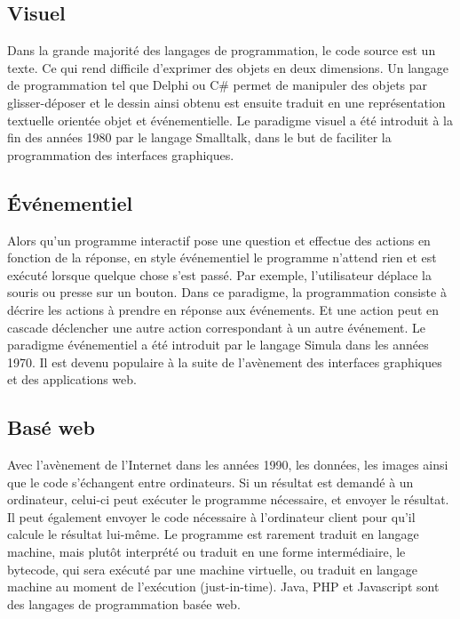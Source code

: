 \documentclass[a4paper,12pt]{article}
\begin{document}
\subsection{Visuel}

Dans la grande majorité des langages de programmation, le code source est un texte. Ce qui rend difficile d'exprimer des objets en deux dimensions\cite{kumar}. Un langage de programmation tel que Delphi ou C\# permet de manipuler des objets par glisser-déposer et le dessin ainsi obtenu est ensuite traduit en une représentation textuelle orientée objet et événementielle. Le paradigme visuel a été introduit à la fin des années 1980 par le langage Smalltalk, dans le but de faciliter la programmation des interfaces graphiques\cite{kumar}.

\subsection{Événementiel}

Alors qu'un programme interactif pose une question et effectue des actions en fonction de la réponse, en style événementiel le programme n'attend rien et est exécuté lorsque quelque chose s'est passé\cite{kumar}. Par exemple, l'utilisateur déplace la souris ou presse sur un bouton. Dans ce paradigme, la programmation consiste à décrire les actions à prendre en réponse aux événements. Et une action peut en cascade déclencher une autre action correspondant à un autre événement\cite{kumar}. Le paradigme événementiel a été introduit par le langage Simula dans les années 1970. Il est devenu populaire à la suite de l'avènement des interfaces graphiques et des applications web\cite{kumar}.

\subsection{Basé web}

Avec l’avènement de l'Internet dans les années 1990, les données, les images ainsi que le code s'échangent entre ordinateurs. Si un résultat est demandé à un ordinateur, celui-ci peut exécuter le programme nécessaire, et envoyer le résultat. Il peut également envoyer le code nécessaire à l'ordinateur client pour qu'il calcule le résultat lui-même\cite{kumar}. Le programme est rarement traduit en langage machine, mais plutôt interprété ou traduit en une forme intermédiaire, le bytecode, qui sera exécuté par une machine virtuelle, ou traduit en langage machine au moment de l'exécution (just-in-time). Java, PHP et Javascript sont des langages de programmation basée web\cite{kumar}.
\end{document}
